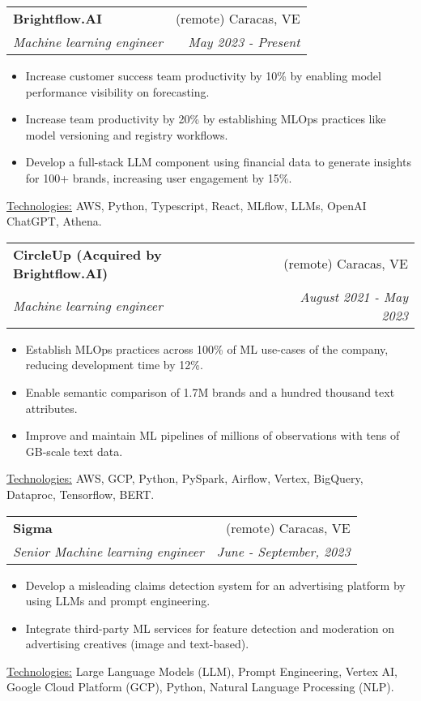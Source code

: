 \documentclass[letterpaper,11pt]{article}
\makeatletter
\newcommand{\sepsection}{\vspace{25pt}}
\newcommand{\resumeItem}[1]{%
  \item\small{
    #1
  }
}
\newcommand{\resumeSubheading}[4]{
  \vspace{8pt}\item%
    \begin{tabular*}{0.97\textwidth}[t]{l@{\extracolsep{\fill}}r}
      \textbf{#1} & #2 \\
      \textit{\small#3} & \textit{\small #4} \\
    \end{tabular*}\vspace{-5pt}
}
\newcommand{\resumeItemListStart}{\begin{itemize}}
\newcommand{\resumeItemListEnd}{\end{itemize}\vspace{-5pt}}
\newcommand{\resumeTech}[2]{
 \underline{#1:} #2
}
\makeatother
\begin{document}
    \resumeSubheading
      {Brightflow.AI}{(remote) Caracas, VE}
      {Machine learning engineer}{May 2023 - Present}
      \resumeItemListStart
      \resumeItem{Increase customer success team productivity by 10\% by enabling model performance visibility on forecasting.}
      \resumeItem{Increase team productivity by 20\% by establishing MLOps practices like model versioning and registry workflows.}
      \resumeItem{Develop a full-stack LLM component using financial data to generate insights for 100+ brands, increasing user engagement by 15\%.}
      \resumeItemListEnd
      \resumeTech{Technologies}{AWS, Python, Typescript, React, MLflow, LLMs, OpenAI ChatGPT, Athena.}\\
    \sepsection


    \resumeSubheading
      {CircleUp (Acquired by Brightflow.AI)}{(remote) Caracas, VE}
      {Machine learning engineer}{August 2021 - May 2023}
      \resumeItemListStart
      \resumeItem{Establish MLOps practices across 100\% of ML use-cases of the company, reducing development time by 12\%.}
      \resumeItem{Enable semantic comparison of 1.7M brands and a hundred thousand text attributes.}
      \resumeItem{Improve and maintain ML pipelines of millions of observations with tens of GB-scale text data.}
      \resumeItemListEnd
      \resumeTech{Technologies}{AWS, GCP, Python, PySpark, Airflow, Vertex, BigQuery, Dataproc, Tensorflow, BERT.}\\
    \sepsection

    \resumeSubheading
      {Sigma}{(remote) Caracas, VE}
      {Senior Machine learning engineer}{June - September, 2023}
      \resumeItemListStart
      \resumeItem{Develop a misleading claims detection system for an advertising platform by using LLMs and prompt engineering.}
      \resumeItem{Integrate third-party ML services for feature detection and moderation on advertising creatives (image and text-based).}
      \resumeItemListEnd
      \resumeTech{Technologies}{Large Language Models (LLM), Prompt Engineering, Vertex AI, Google Cloud Platform (GCP), Python, Natural Language Processing (NLP).}\\
    \sepsection
\end{document}
